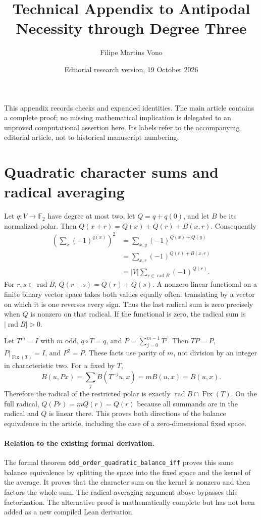 \documentclass[11pt,a4paper]{article}
\title{Technical Appendix to Antipodal Necessity through Degree Three}
\author{Filipe Martins Vono}
\date{Editorial research version, 19 October 2026}
\newcommand{\F}{\mathbb F_2}
\newcommand{\rad}{\operatorname{rad}}
\newcommand{\Fix}{\operatorname{Fix}}
\begin{document}
\maketitle
\noindent This appendix records checks and expanded identities. The main article contains a complete proof; no missing mathematical implication is delegated to an unproved computational assertion here. Its labels refer to the accompanying editorial article, not to historical manuscript numbering.

\section{Quadratic character sums and radical averaging}
Let $q:V\to\F$ have degree at most two, let $Q=q+q(0)$, and let $B$ be its normalized polar. Then $Q(x+r)=Q(x)+Q(r)+B(x,r)$. Consequently
\begin{align*}
 \left(\sum_x(-1)^{q(x)}\right)^2
 &=\sum_{x,y}(-1)^{Q(x)+Q(y)}\\
 &=\sum_{x,r}(-1)^{Q(r)+B(x,r)}\\
 &=|V|\sum_{r\in\rad B}(-1)^{Q(r)}.
\end{align*}
For $r,s\in\rad B$, $Q(r+s)=Q(r)+Q(s)$. A nonzero linear functional on a finite binary vector space takes both values equally often: translating by a vector on which it is one reverses every sign. Thus the last radical sum is zero precisely when $Q$ is nonzero on that radical. If the functional is zero, the radical sum is $|\rad B|>0$.

Let $T^m=I$ with $m$ odd, $q\circ T=q$, and $P=\sum_{j=0}^{m-1}T^j$. Then $TP=P$, $P|_{\Fix(T)}=I$, and $P^2=P$. These facts use parity of $m$, not division by an integer in characteristic two. For $u$ fixed by $T$,
\[
 B(u,Px)=\sum_jB(T^{-j}u,x)=mB(u,x)=B(u,x).
\]
Therefore the radical of the restricted polar is exactly $\rad B\cap\Fix(T)$. On the full radical, $Q(Pr)=mQ(r)=Q(r)$ because all summands are in the radical and $Q$ is linear there. This proves both directions of the balance equivalence in the article, including the case of a zero-dimensional fixed space.

\paragraph{Relation to the existing formal derivation.}
The formal theorem \nolinkurl{odd_order_quadratic_balance_iff} proves this same balance equivalence by splitting the space into the fixed space and the kernel of the average. It proves that the character sum on the kernel is nonzero and then factors the whole sum. The radical-averaging argument above bypasses this factorization. The alternative proof is mathematically complete but has not been added as a new compiled Lean derivation.
\end{document}
